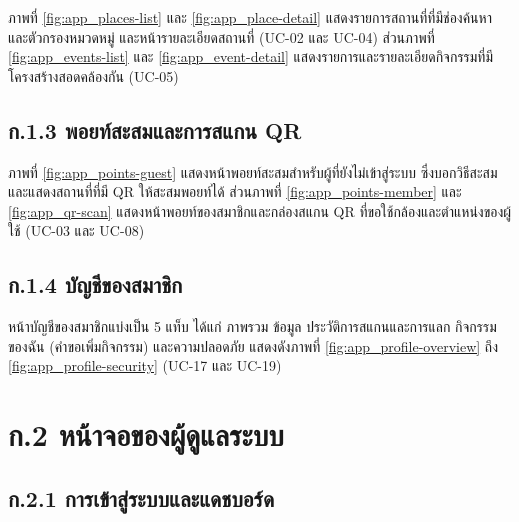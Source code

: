 ภาพที่ \ref{fig:app_places-list} และ \ref{fig:app_place-detail} แสดงรายการสถานที่ที่มีช่องค้นหาและตัวกรองหมวดหมู่ และหน้ารายละเอียดสถานที่ (UC-02 และ UC-04) ส่วนภาพที่ \ref{fig:app_events-list} และ \ref{fig:app_event-detail} แสดงรายการและรายละเอียดกิจกรรมที่มีโครงสร้างสอดคล้องกัน (UC-05)


\subsection*{ก.1.3 พอยท์สะสมและการสแกน QR}

ภาพที่ \ref{fig:app_points-guest} แสดงหน้าพอยท์สะสมสำหรับผู้ที่ยังไม่เข้าสู่ระบบ ซึ่งบอกวิธีสะสมและแสดงสถานที่ที่มี QR ให้สะสมพอยท์ได้ ส่วนภาพที่ \ref{fig:app_points-member} และ \ref{fig:app_qr-scan} แสดงหน้าพอยท์ของสมาชิกและกล่องสแกน QR ที่ขอใช้กล้องและตำแหน่งของผู้ใช้ (UC-03 และ UC-08)


\subsection*{ก.1.4 บัญชีของสมาชิก}

หน้าบัญชีของสมาชิกแบ่งเป็น 5 แท็บ ได้แก่ ภาพรวม ข้อมูล ประวัติการสแกนและการแลก กิจกรรมของฉัน (คำขอเพิ่มกิจกรรม) และความปลอดภัย แสดงดังภาพที่ \ref{fig:app_profile-overview} ถึง \ref{fig:app_profile-security} (UC-17 และ UC-19)


\section*{ก.2 หน้าจอของผู้ดูแลระบบ}

\subsection*{ก.2.1 การเข้าสู่ระบบและแดชบอร์ด}

